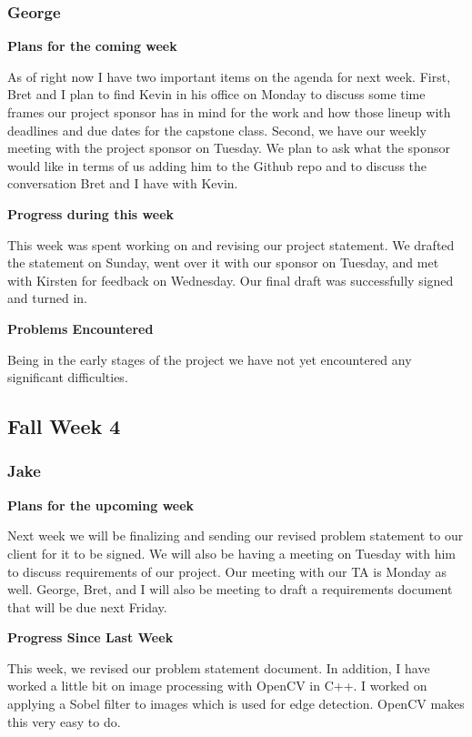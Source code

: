 \documentclass[10pt, onecolumn, draftclsnofoot, letterpaper, compsoc]{IEEEtran}
\begin{document}
    \subsubsection{George}

    \noindent \textbf{Plans for the coming week}

    As of right now I have two important items on the agenda for next week. First,
    Bret and I plan to find Kevin in his office on Monday to discuss some time
    frames our project sponsor has in mind for the work and how those lineup with
    deadlines and due dates for the capstone class. Second, we have our weekly meeting
    with the project sponsor on Tuesday. We plan to ask what the sponsor would like
    in terms of us adding him to the Github repo and to discuss the conversation
    Bret and I have with Kevin.

    \noindent \textbf{Progress during this week}

    This week was spent working on and revising our project statement. We drafted
    the statement on Sunday, went over it with our sponsor on Tuesday, and met
    with Kirsten for feedback on Wednesday. Our final draft was successfully
    signed and turned in.

    \noindent \textbf{Problems Encountered}

    Being in the early stages of the project we have not yet encountered any significant difficulties.

\subsection{Fall Week 4}

    \subsubsection{Jake}

    \noindent \textbf{Plans for the upcoming week}

    Next week we will be finalizing and sending our revised problem statement to
    our client for it to be signed. We will also be having a meeting on Tuesday
    with him to discuss requirements of our project. Our meeting with our TA is
    Monday as well. George, Bret, and I will also be meeting to draft a requirements
    document that will be due next Friday.

    \noindent \textbf{Progress Since Last Week}

    This week, we revised our problem statement document. In addition, I have
    worked a little bit on image processing with OpenCV in C++. I worked on applying
    a Sobel filter to images which is used for edge detection. OpenCV makes this very easy to do.
\end{document}
